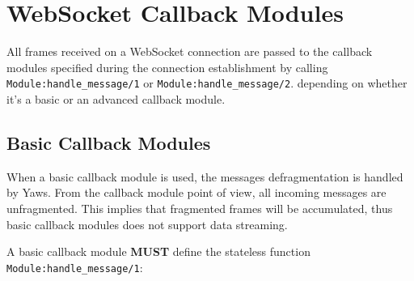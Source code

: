 \documentclass[11pt,oneside,english]{book}
\newcommand{\Yaws}            %
        {{\sc Yaws}}
\begin{document}
\section{WebSocket Callback Modules}


All frames received on a WebSocket connection are passed to the callback
modules specified during the connection establishment by calling
\verb+Module:handle_message/1+ or \verb+Module:handle_message/2+.
depending on whether it's a basic or an advanced callback module.


\subsection{Basic Callback Modules}
\label{basic-callback-modules}

When a basic callback module is used, the messages defragmentation is handled by
\Yaws. From the callback module point of view, all incoming messages are
unfragmented. This implies that fragmented frames will be accumulated, thus
basic callback modules does not support data streaming.

A basic callback module \textbf{MUST} define the stateless function
\verb+Module:handle_message/1+:
\end{document}
